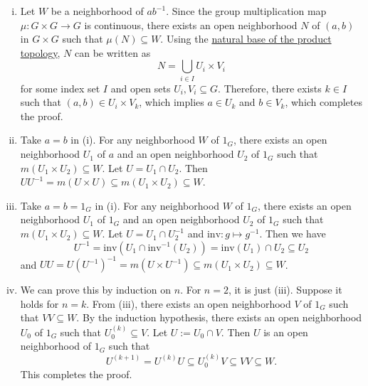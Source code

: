 \documentclass{report}
\begin{document}
\begin{prf}
	\begin{enumerate}[(i)]
		\item Let $W$ be a neighborhood of $ab^{-1}$. Since the group multiplication map $\mu:G\times G\to G$ is continuous, there exists an open neighborhood $N$ of $(a,b)$ in $G\times G$ such that $\mu(N)\subseteq W$. Using the \hyperref[th:basis_of_product_topology]{natural base of the product topology}, $N$ can be written as 
	\[
	N=\bigcup_{i\in I} U_i\times V_i
	\]
	for some index set $I$ and open sets $U_i, V_i\subseteq G$. Therefore, there exists $k\in I$ such that $(a,b)\in U_i\times V_k$, which implies $a\in U_k$ and $b\in V_k$, which completes the proof.
	\item Take $a=b$ in (i). For any neighborhood $W$ of $1_G$, there exists an open neighborhood $U_1$ of $a$ and an open neighborhood $U_2$ of $1_G$ such that $m(U_1\times U_2)\subseteq W$. Let $U=U_1\cap U_2$. Then $UU^{-1}= m(U\times U)\subseteq m(U_1\times U_2)\subseteq W$.
	\item Take $a=b=1_G$ in (i). For any neighborhood $W$ of $1_G$, there exists an open neighborhood $U_1$ of $1_G$ and an open neighborhood $U_2$ of $1_G$ such that $m(U_1\times U_2)\subseteq W$. Let $U=U_1\cap U_2^{-1}$ and $\mathrm{inv}:g\mapsto g^{-1}$. Then we have 
	\[
	U^{-1}=\mathrm{inv}(U_1\cap \mathrm{inv}^{-1}(U_2))=\mathrm{inv}(U_1)\cap U_2\subseteq U_2
	\] 
	and $UU=U(U^{-1})^{-1}=  m(U\times U^{-1})\subseteq m(U_1\times U_2)\subseteq W$.
	\item We can prove this by induction on $n$. For $n=2$, it is just (iii). Suppose it holds for $n=k$. From (iii), there exists an open neighborhood $V$ of $1_G$ such that $VV\subseteq W$. By the induction hypothesis, there exists an open neighborhood $U_0$ of $1_G$ such that $U_0^{(k)}\subseteq V$. Let $U:=U_0\cap V$. Then $U$ is an open neighborhood of $1_G$ such that
	\[
		U^{(k+1)}=U^{(k)}U\subseteq U_0^{(k)} V\subseteq VV\subseteq W.
	\]
	This completes the proof.
\end{enumerate}
\end{prf}
\end{document}
